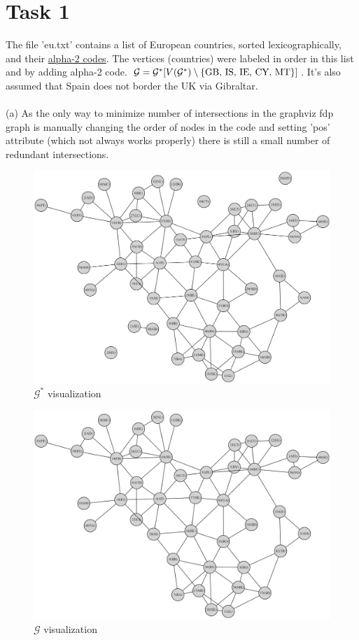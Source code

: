 \documentclass{article}
\begin{document}
	\section*{Task 1}
	The file 'eu.txt' contains a list of European countries, sorted lexicographically, and their \href{https://en.wikipedia.org/wiki/ISO_3166-1_alpha-2#:~:text=ISO%203166%2D1%20alpha%2D2%20codes%20are%20two%2Dletter,special%20areas%20of%20geographical%20interest.}{alpha-2 codes}. The vertices (countries) were labeled in order in this list and by adding alpha-2 code. $\mathcal{G} = \mathcal{G}^*[V(\mathcal{G}^*)\setminus \{\textmd{GB, IS, IE, CY, MT\}}]$. It's also assumed that Spain does not border the UK via Gibraltar.\\\\
	(a) As the only way to minimize number of intersections in the graphviz fdp graph is manually changing the order of nodes in the code and setting 'pos' attribute (which not always works properly) there is still a small number of redundant intersections.
	\begin{figure}[h]
		\centering
		\includegraphics[width=1\textwidth]{G_star.png}
		\caption{$\mathcal{G}^*$ visualization}
	\end{figure}\newpage
	\begin{figure}[h]
		\centering
		\includegraphics[width=1\textwidth]{G.png}
		\caption{$\mathcal{G}$ visualization}
	\end{figure}\newpage
\end{document}
